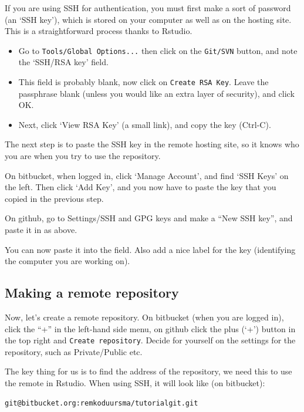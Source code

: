 \documentclass[]{book}
\providecommand{\tightlist}{%
  \setlength{\itemsep}{0pt}\setlength{\parskip}{0pt}}
\begin{document}
If you are using SSH for authentication, you must first make a sort of password (an `SSH key'), which is stored on your computer as well as on the hosting site. This is a straightforward process thanks to Rstudio.

\begin{itemize}
\tightlist
\item
  Go to \texttt{Tools/Global\ Options...} then click on the \texttt{Git/SVN} button, and note the `SSH/RSA key' field.
\item
  This field is probably blank, now click on \texttt{Create\ RSA\ Key}. Leave the passphrase blank (unless you would like an extra layer of security), and click OK.
\item
  Next, click `View RSA Key' (a small link), and copy the key (Ctrl-C).
\end{itemize}

The next step is to paste the SSH key in the remote hosting site, so it knows who you are when you try to use the repository.

On bitbucket, when logged in, click `Manage Account', and find `SSH Keys' on the left. Then click `Add Key', and you now have to paste the key that you copied in the previous step.

On github, go to Settings/SSH and GPG keys and make a ``New SSH key'', and paste it in as above.

You can now paste it into the field. Also add a nice label for the key (identifying the computer you are working on).

\hypertarget{makeremotegit}{%
\subsection{Making a remote repository}\label{makeremotegit}}

Now, let's create a remote repository. On bitbucket (when you are logged in), click the ``+'' in the left-hand side menu, on github click the plus (`+') button in the top right and \texttt{Create\ repository}. Decide for yourself on the settings for the repository, such as Private/Public etc.

The key thing for us is to find the address of the repository, we need this to use the remote in Rstudio. When using SSH, it will look like (on bitbucket):

\begin{verbatim}
git@bitbucket.org:remkoduursma/tutorialgit.git
\end{verbatim}
\end{document}
